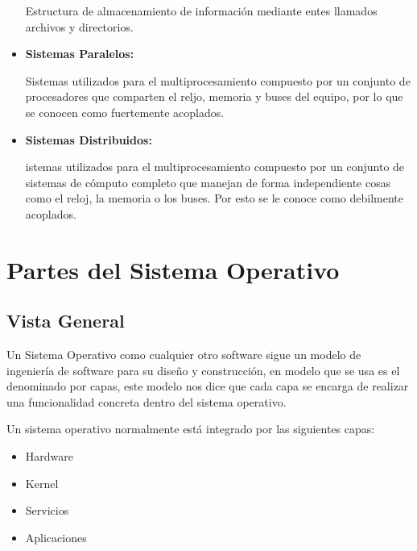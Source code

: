 \documentclass[12pt, fleqn]{report}                             %
\begin{document}
\begin{itemize}
                    Estructura de almacenamiento de información mediante entes llamados
                    archivos y directorios.

                \item
                    \textbf{Sistemas Paralelos: }

                    Sistemas utilizados para el multiprocesamiento compuesto por un conjunto
                    de procesadores que comparten el reljo, memoria y buses del equipo, por lo
                    que se conocen como fuertemente acoplados.

                \item
                    \textbf{Sistemas Distribuidos: }

                    istemas utilizados para el multiprocesamiento compuesto por un conjunto
                    de sistemas de cómputo completo que manejan de forma independiente cosas
                    como el reloj, la memoria o los buses. Por esto se le conoce como debilmente
                    acoplados.

            \end{itemize}



    \chapter{Partes del Sistema Operativo}

        \clearpage
        \section{Vista General}

            Un Sistema Operativo como cualquier otro software sigue un modelo de ingeniería de
            software para su diseño y construcción, en modelo que se usa es el denominado por capas,
            este modelo nos dice que cada capa se encarga de realizar una funcionalidad concreta
            dentro del sistema operativo.

            Un sistema operativo normalmente está integrado por las siguientes capas:
            \begin{itemize}
                \item Hardware
                \item Kernel
                \item Servicios        
                \item Aplicaciones
            \end{itemize}  
\end{document}
